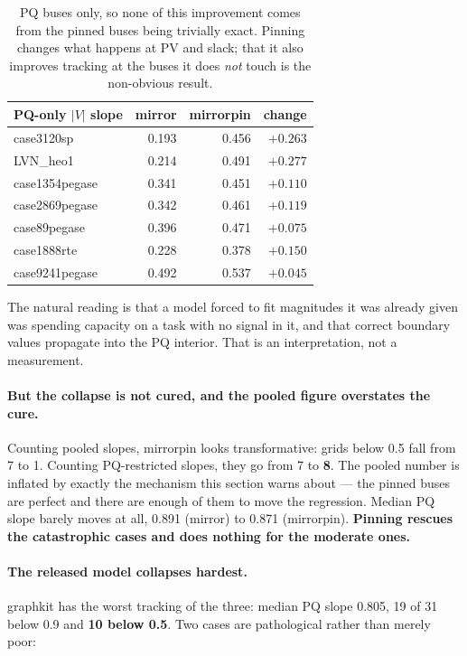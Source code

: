 \documentclass[10pt]{article}
\begin{document}
\begin{table}[H]
\centering
\small
\begin{tabular}{lrrr}
\toprule
PQ-only $|V|$ slope & mirror & mirrorpin & change \\
\midrule
case3120sp     & 0.193 & 0.456 & $+0.263$ \\
LVN\_heo1      & 0.214 & 0.491 & $+0.277$ \\
case1354pegase & 0.341 & 0.451 & $+0.110$ \\
case2869pegase & 0.342 & 0.461 & $+0.119$ \\
case89pegase   & 0.396 & 0.471 & $+0.075$ \\
case1888rte    & 0.228 & 0.378 & $+0.150$ \\
case9241pegase & 0.492 & 0.537 & $+0.045$ \\
\bottomrule
\end{tabular}
\caption{PQ buses only, so none of this improvement comes from the pinned buses
being trivially exact. Pinning changes what happens at PV and slack; that it
also improves tracking at the buses it does \emph{not} touch is the
non-obvious result.}
\end{table}

The natural reading is that a model forced to fit magnitudes it was already
given was spending capacity on a task with no signal in it, and that correct
boundary values propagate into the PQ interior. That is an interpretation, not
a measurement.

\paragraph{But the collapse is not cured, and the pooled figure overstates the
cure.} Counting pooled slopes, mirrorpin looks transformative: grids below 0.5
fall from 7 to 1. Counting PQ-restricted slopes, they go from 7 to \textbf{8}.
The pooled number is inflated by exactly the mechanism this section warns
about --- the pinned buses are perfect and there are enough of them to move the
regression. Median PQ slope barely moves at all, 0.891 (mirror) to 0.871
(mirrorpin). \textbf{Pinning rescues the catastrophic cases and does nothing for
the moderate ones.}

\paragraph{The released model collapses hardest.} graphkit has the worst
tracking of the three: median PQ slope 0.805, 19 of 31 below 0.9 and \textbf{10
below 0.5}. Two cases are pathological rather than merely poor:
\end{document}
